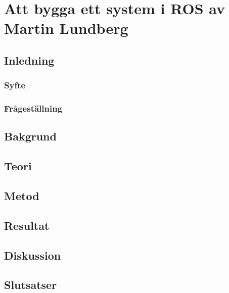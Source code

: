 \chapter{Att bygga ett system i ROS av Martin Lundberg}
\label{cha:indiv-report-person}

\section{Inledning}
\label{sec:introduction-person}



\subsection{Syfte}
\label{sec:purpose-person}


\subsection{Frågeställning}
\label{sec:issue-person}


\section{Bakgrund}
\label{sec:background-person}


\section{Teori}
\label{sec:theory-person}


\section{Metod}
\label{sec:method-person}


\section{Resultat}
\label{sec:results-person}


\section{Diskussion}
\label{sec:discussion-person}


\section{Slutsatser}
\label{sec:conclusions-person}


